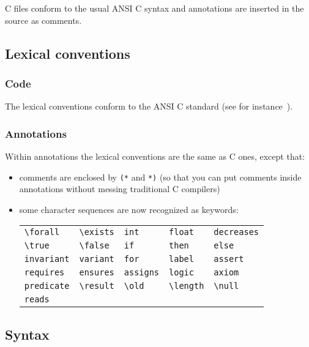 \documentclass[a4paper,12pt]{report}
\begin{document}
C files conform to the usual ANSI C
syntax and annotations are inserted in the source as comments.

\subsection{Lexical conventions}
\label{lexical:c}

\subsubsection{Code}

The lexical conventions conform to the ANSI C standard (see
for instance~\cite{KR88}).

\subsubsection{Annotations}

Within annotations the lexical conventions are the same as C ones,
except that:
\begin{itemize}
\item comments are enclosed by \texttt{(*} and \texttt{*)} (so that
  you can put comments inside annotations without messing traditional
  C compilers)
\item some character sequences are now recognized as keywords: \par
  \begin{center}
  \begin{tabular}{l@{\qquad}l@{\qquad}l@{\qquad}l@{\qquad}l}
  \verb!\forall! & \verb!\exists! & \verb!int! & \verb!float! &
  \verb!decreases! \\
  \verb!\true! & \verb!\false! & \verb!if! & \verb!then! & \verb!else! \\
  \verb!invariant! & \verb!variant! & \verb!for! & \verb!label! & 
  \verb!assert! \\ 
  \verb!requires! & \verb!ensures! & \verb!assigns! & \verb!logic! & 
  \verb!axiom! \\
  \verb!predicate! & \verb!\result! & \verb!\old! & 
  \verb!\length! & \verb!\null! \\
  \verb!reads!
  \end{tabular}
  \end{center}
\end{itemize}

\subsection{Syntax}
\end{document}
